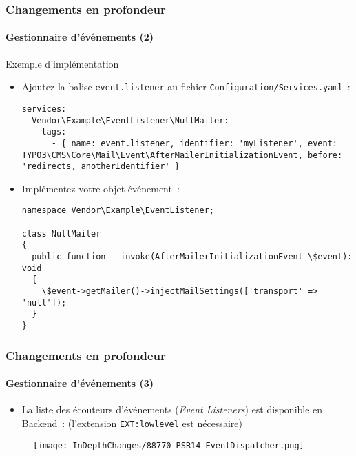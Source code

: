 \begin{frame}[fragile]
	\frametitle{Changements en profondeur}
	\framesubtitle{Gestionnaire d'événements (2)}

	\lstset{basicstyle=\tiny\ttfamily}

	Exemple d'implémentation

	\begin{itemize}\smaller
		\item[\ding{202}] Ajoutez la balise \texttt{event.listener} au fichier \texttt{Configuration/Services.yaml}~:
\begin{lstlisting}
services:
  Vendor\Example\EventListener\NullMailer:
    tags:
      - { name: event.listener, identifier: 'myListener', event: TYPO3\CMS\Core\Mail\Event\AfterMailerInitializationEvent, before: 'redirects, anotherIdentifier' }
\end{lstlisting}

		\item[\ding{203}] Implémentez votre objet événement~:
\begin{lstlisting}
namespace Vendor\Example\EventListener;

class NullMailer
{
  public function __invoke(AfterMailerInitializationEvent \$event): void
  {
    \$event->getMailer()->injectMailSettings(['transport' => 'null']);
  }
}
\end{lstlisting}

	\end{itemize}\normalsize

\end{frame}


\begin{frame}[fragile]
	\frametitle{Changements en profondeur}
	\framesubtitle{Gestionnaire d'événements (3)}

	\lstset{basicstyle=\tiny\ttfamily}

	\begin{itemize}
		\item La liste des écouteurs d'événements (\textit{Event Listeners}) est disponible en Backend~:\newline
			\smaller
				(l'extension \texttt{EXT:lowlevel} est nécessaire)
			\normalsize
	\end{itemize}

	\begin{figure}
		\texttt{[image: InDepthChanges/88770-PSR14-EventDispatcher.png]}
	\end{figure}

\end{frame}

